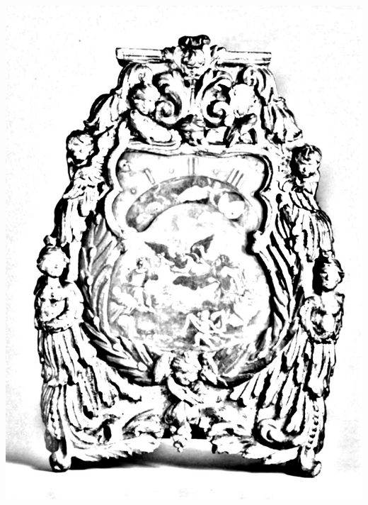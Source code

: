 \documentclass[hidelinks,12pt,a4paper]{article}
\begin{document}
\begin{adjustwidth}{-30mm}{-30mm}
			\thispagestyle{empty}
			\begin{minipage}{0.94\linewidth}
				\centering
				\includegraphics[scale=0.6]{Orologio_notturno.jpg}
			\end{minipage}
			
			\vspace*{\fill}
			\newpage
			

\end{adjustwidth}
\end{document}
